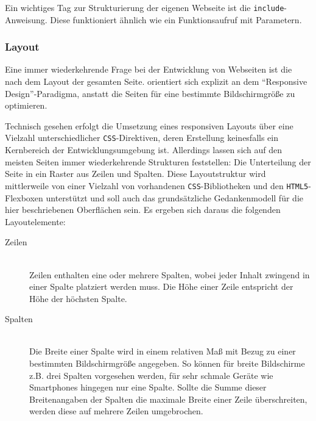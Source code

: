 Ein wichtiges Tag zur Strukturierung der eigenen Webseite ist die \texttt{include}-Anweisung. Diese funktioniert ähnlich wie ein Funktionsaufruf mit Parametern.


\subsubsection{Layout}

Eine immer wiederkehrende Frage bei der Entwicklung von Webseiten ist die nach dem Layout der gesamten Seite. \idename{} orientiert sich explizit an dem "`Responsive Design"'-Paradigma, anstatt die Seiten für eine bestimmte Bildschirmgröße zu optimieren.

Technisch gesehen erfolgt die Umsetzung eines responsiven Layouts über eine Vielzahl unterschiedlicher \texttt{CSS}-Direktiven, deren Erstellung keinesfalls ein Kernbereich der Entwicklungsumgebung ist. Allerdings lassen sich auf den meisten Seiten immer wiederkehrende Strukturen feststellen: Die Unterteilung der Seite in ein Raster aus Zeilen und Spalten. Diese Layoutstruktur wird mittlerweile von einer Vielzahl von vorhandenen \texttt{CSS}-Bib\-lio\-the\-ken und den \texttt{HTML5}-Flex\-boxen unterstützt und soll auch das grundsätzliche Gedankenmodell für die hier beschriebenen Oberflächen sein. Es ergeben sich daraus die folgenden Layoutelemente:

\begin{description}
\item[Zeilen] \hfill \\
  Zeilen enthalten eine oder mehrere Spalten, wobei jeder Inhalt zwingend in einer Spalte platziert werden muss. Die Höhe einer Zeile entspricht der Höhe der höchsten Spalte.
\item[Spalten] \hfill \\
  Die Breite einer Spalte wird in einem relativen Maß mit Bezug zu einer bestimmten Bildschirmgröße angegeben. So können für breite Bildschirme z.B. drei Spalten vorgesehen werden, für sehr schmale Geräte wie Smartphones hingegen nur eine Spalte. Sollte die Summe dieser Breitenangaben der Spalten die maximale Breite einer Zeile überschreiten, werden diese auf mehrere Zeilen umgebrochen.
\end{description}

